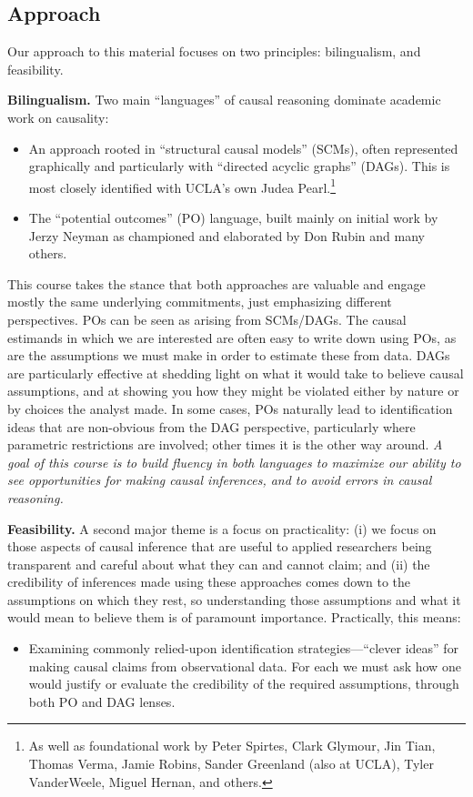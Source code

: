 \documentclass[PS]{syllabus}
\begin{document}
\begin{syllabus}
\section{Approach}

Our approach to this material focuses on two principles: bilingualism, and feasibility.

\textbf{Bilingualism.} Two main ``languages'' of causal reasoning dominate academic work on causality:
\begin{itemize}
\item  An approach rooted in ``structural causal models'' (SCMs), often represented graphically and particularly with ``directed acyclic graphs'' (DAGs). This is most closely identified with UCLA's own Judea Pearl.\footnote{As well as foundational work by Peter Spirtes, Clark Glymour, Jin Tian, Thomas Verma, Jamie Robins, Sander Greenland (also at UCLA), Tyler VanderWeele, Miguel Hernan, and others.}
\item The ``potential outcomes'' (PO) language, built mainly on initial work by Jerzy Neyman as championed and elaborated by Don Rubin and many others.
\end{itemize}

This course takes the stance that both approaches are valuable and engage mostly the same underlying commitments, just emphasizing different perspectives. POs can be seen as arising from SCMs/DAGs. The causal estimands in which we are interested are often easy to write down using POs, as are the assumptions we must make in order to estimate these from data. DAGs are particularly effective at shedding light on what it would take to believe causal assumptions, and at showing you how they might be violated either by nature or by choices the analyst made. In some cases, POs naturally lead to identification ideas that are non-obvious from the DAG perspective, particularly where parametric restrictions are involved; other times it is the other way around. \textit{A goal of this course is to build fluency in both languages to maximize our ability to see opportunities for making causal inferences, and to avoid errors in causal reasoning.}

\textbf{Feasibility.} A second major theme is a focus on practicality: (i) we focus on those aspects of causal inference that are useful to applied researchers being transparent and careful about what they can and cannot claim; and (ii) the credibility of inferences made using these approaches comes down to the assumptions on which they rest, so understanding those assumptions and what it would mean to believe them is of paramount importance. Practically, this means:
\begin{itemize}
\item Examining commonly relied-upon identification strategies---``clever ideas'' for making causal claims from observational data. For each we must ask how one would justify or evaluate the credibility of the required assumptions, through both PO and DAG lenses.


\end{itemize}
\end{syllabus}
\end{document}
